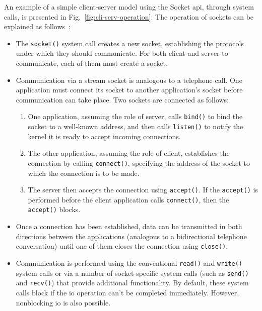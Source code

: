 An example of a simple client-server model using the Socket \gls{api}, through system
calls, is presented in Fig.~\ref{fig:cli-serv-operation}. The operation of sockets can be explained as
follows~\cite{kerrisk2010linux}:
\begin{itemize}
\item The \texttt{socket()} system call creates a new socket, establishing the
  protocols under which they should communicate. For both client and server to
communicate, each of them must create a socket.
\item  Communication via a stream socket is analogous to a telephone call. One
application must connect its socket to another application’s socket before
communication can take place. Two sockets are connected as follows:
\begin{enumerate}
\item One application, assuming the role of server, calls \texttt{bind()} to
  bind the socket to a well-known address, and then calls \texttt{listen()} to
  notify the kernel it is ready to accept incoming connections.
\item The other application, assuming the role of client, establishes the
  connection by calling \texttt{connect()}, specifying the address of the socket
  to which the connection is to be made.
\item The server then accepts the connection using \texttt{accept()}. If the
  \texttt{accept()} is performed before the client application calls
  \texttt{connect()}, then the \texttt{accept()} blocks.
\end{enumerate}
\item Once a connection has been established, data can be transmitted in both
directions between the applications (analogous to a bidirectional telephone
conversation) until one of them closes the connection using \texttt{close()}.
\item Communication is performed using the conventional \texttt{read()} and
  \texttt{write()} system calls or via a number of socket-specific system calls
  (such as \texttt{send()} and \texttt{recv()}) that provide additional
  functionality. By default, these system calls block if the \gls{io} operation
  can’t be completed immediately. However, nonblocking \gls{io} is also
  possible.
\end{itemize}

